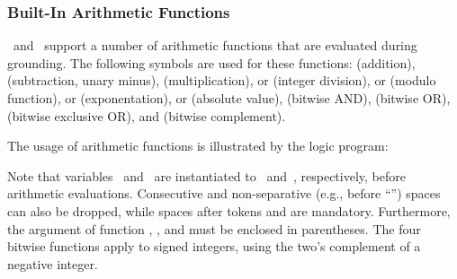 \subsubsection{Built-In Arithmetic Functions}\label{subsec:gringo:arith}

\gringo\ and \clingo\ support a number of arithmetic functions that
are evaluated during grounding.
The following symbols are used for these functions:
\code{+} (addition),
\code{-} (subtraction, unary minus),
\code{*} (multiplication),
\code{/} or  (integer division),
\code{\textbackslash} or  (modulo function),
\code{**} or  (exponentation),
\code{|$\cdot$|} or  (absolute value),
\code{\&} (bitwise AND),
 (bitwise OR),
\code{\^} (bitwise exclusive OR), and
\code{\textasciitilde} (bitwise complement).

\begin{example}\label{ex:arith:fun}
The usage of arithmetic functions is illustrated by the logic program:%
%

%
Note that variables~ and~ are instantiated to~ and~,
respectively, before arithmetic evaluations.
Consecutive and non-separative (e.g., before ``\code{(}'')
spaces can also be dropped,
while spaces after tokens  and  are mandatory.
Furthermore, the argument of function , , and  must be enclosed in parentheses.
The four bitwise functions apply to signed integers,
using the two's complement of a negative integer.
\eexample
\end{example}

